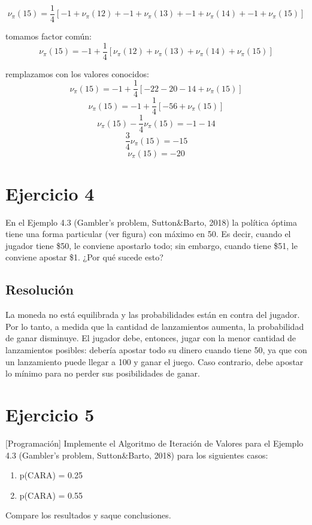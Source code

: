 \documentclass[12pt,a4paper]{article}
\begin{document}
$$ \nu_\pi(15) = \frac{1}{4} [ -1 + \nu_\pi(12) + -1 + \nu_\pi(13) + -1 + \nu_\pi(14) + -1 + \nu_\pi(15)] $$

tomamos factor común:
$$ \nu_\pi(15) = -1 + \frac{1}{4} [\nu_\pi(12) + \nu_\pi(13) + \nu_\pi(14) + \nu_\pi(15)] $$

remplazamos con los valores conocidos:
$$ \nu_\pi(15) = -1 + \frac{1}{4} [-22 - 20 - 14 + \nu_\pi(15)] $$
$$ \nu_\pi(15) = -1 + \frac{1}{4} [-56 + \nu_\pi(15)] $$
$$ \nu_\pi(15) - \frac{1}{4}\nu_\pi(15) = -1 - 14 $$
$$ \frac{3}{4}\nu_\pi(15) = -15 $$
$$ \nu_\pi(15) = -20 $$

\section{Ejercicio 4}

En el Ejemplo 4.3 (Gambler's problem, Sutton\&Barto, 2018) la política óptima tiene una forma particular 
(ver figura) con máximo en 50. Es decir,  cuando  el  jugador  tiene \$50,  le  conviene apostarlo todo; 
sin embargo, cuando tiene \$51, le conviene apostar \$1. ¿Por qué sucede esto?

\subsection{Resolución}

La moneda no está equilibrada y las probabilidades están en contra del jugador. Por lo tanto,
a medida que la cantidad de lanzamientos aumenta, la probabilidad de ganar disminuye. El jugador 
debe, entonces, jugar con la menor cantidad de lanzamientos posibles: debería
apostar todo su dinero cuando tiene 50, ya que con un lanzamiento puede llegar a 100 y ganar el juego.
Caso contrario, debe apostar lo mínimo para no perder sus posibilidades de ganar.

\section{Ejercicio 5}

[Programación] Implemente el Algoritmo de Iteración de Valores para el Ejemplo 4.3 (Gambler's problem, 
Sutton\&Barto, 2018) para los siguientes casos:

\begin{enumerate}
  \item p(CARA) = 0.25
  \item p(CARA) = 0.55 
\end{enumerate}

Compare los resultados y saque conclusiones.
\end{document}
